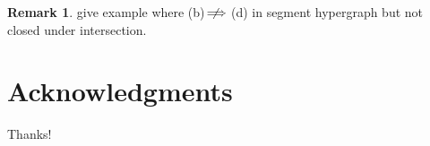 \documentclass[reqno]{amsart}
\theoremstyle{definition}
\newtheorem{remark}[theorem]{Remark}
\begin{document}
\begin{remark} give example where (b)$\,\,\,\not\!\!\!\!\implies$(d) in segment hypergraph but not closed under intersection.
\end{remark} 

\section*{Acknowledgments}

Thanks!



\label{sec:biblio}

\end{document}
